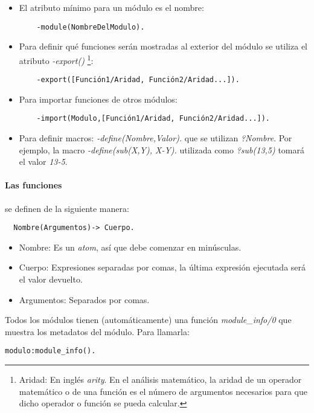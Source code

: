 \begin{itemize}
  \item El atributo mínimo para un módulo es el nombre:
    \begin{verbatim}
    -module(NombreDelModulo).
    \end{verbatim}

  \item Para definir qué funciones serán mostradas al exterior del módulo se utiliza el atributo
    \textit{-export()} \footnote{Aridad: En inglés \textit{arity}. En el análisis
    matemático, la aridad de un operador matemático o de una función es el número de argumentos necesarios
    para que dicho operador o función se pueda calcular.}:
    \begin{verbatim}
    -export([Función1/Aridad, Función2/Aridad...]).
    \end{verbatim}

  \item Para importar funciones de otros módulos:
    \begin{verbatim}
    -import(Modulo,[Función1/Aridad, Función2/Aridad...]).
    \end{verbatim}

  \item Para definir macros: \textit{-define(Nombre,Valor).} que se utilizan \textit{?Nombre}. Por ejemplo,
  la macro \textit{-define(sub(X,Y), X-Y).} utilizada como \textit{?sub(13,5)} tomará el valor \textit{13-5}.
\end{itemize}


\paragraph{Las funciones} se definen de la siguiente manera:
  \begin{verbatim}
  Nombre(Argumentos)-> Cuerpo.
  \end{verbatim}

\begin{itemize}
  \item Nombre: Es un \textit{atom}, así que debe comenzar en minúsculas.
  \item Cuerpo: Expresiones separadas por comas, la última expresión ejecutada será el valor devuelto.
  \item Argumentos: Separados por comas.
\end{itemize}

Todos los módulos tienen (automáticamente) una función \textit{module_info/0} que muestra los metadatos del
módulo. Para llamarla:
\begin{lstlisting}
modulo:module_info().
\end{lstlisting}



